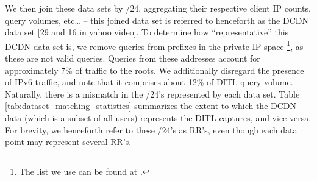\documentclass[sigconf,nonacm,10pt]{acmart}
\begin{document}
\begin{table}[]
\centering
{}
\caption{Statistics displaying the extent to which the RR's of users in a large CDN represent RR's seen in the 2018 DITL captures. Also shown is the extent to which RR's of RIPE probes represent the 2018 DITL captures.}
\label{tab:dataset_matching_statistics}
\end{table}

We then join these data sets by /24, aggregating their respective client
IP counts, query volumes, etc\ldots{} -- this joined data set is
referred to henceforth as the DCDN data set {[}29 and 16 in yahoo
video{]}. To determine how ``representative'' this DCDN data set is, we
remove queries from prefixes in the private IP space
\footnote{ The list we use can be found at \cite{private_ip_space}.}, as
these are not valid queries. Queries from these addresses account for
approximately 7\% of traffic to the roots. We additionally disregard the
presence of IPv6 traffic, and note that it comprises about 12\% of DITL
query volume. Naturally, there is a mismatch in the /24's represented by
each data set. Table \ref{tab:dataset_matching_statistics} summarizes
the extent to which the DCDN data (which is a subset of all users)
represents the DITL captures, and vice versa. For brevity, we henceforth
refer to these /24's as RR's, even though each data point may represent
several RR's.
\end{document}
